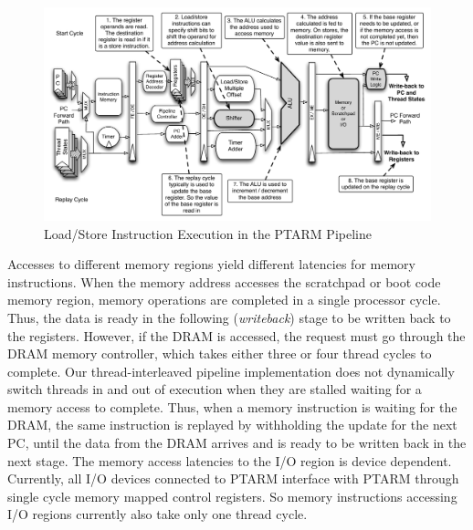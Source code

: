 \begin{figure}[h]
  \begin{center}
    \includegraphics[scale=.54]{figs/ldstr_pipeline_implementation}
  \end{center}
  \vspace{-3mm}
  \caption{Load/Store Instruction Execution in the PTARM Pipeline}
  \label{fig:ldstr_pipeline_implementation}
\end{figure}

Accesses to different memory regions yield different latencies for memory instructions.
When the memory address accesses the scratchpad or boot code memory region, memory operations are completed in a single processor cycle.
Thus, the data is ready in the following (\emph{writeback}) stage to be written back to the registers.
However, if the DRAM is accessed, the request must go through the DRAM memory controller, which takes either three or four thread cycles to complete.
Our thread-interleaved pipeline implementation does not dynamically switch threads in and out of execution when they are stalled waiting for a memory access to complete. 
Thus, when a memory instruction is waiting for the DRAM, the same instruction is replayed by withholding the update for the next PC, until the data from the DRAM arrives and is ready to be written back in the next stage.
The memory access latencies to the I/O region is device dependent.   
Currently, all I/O devices connected to PTARM interface with PTARM through single cycle memory mapped control registers.
So memory instructions accessing I/O regions currently also take only one thread cycle.  

